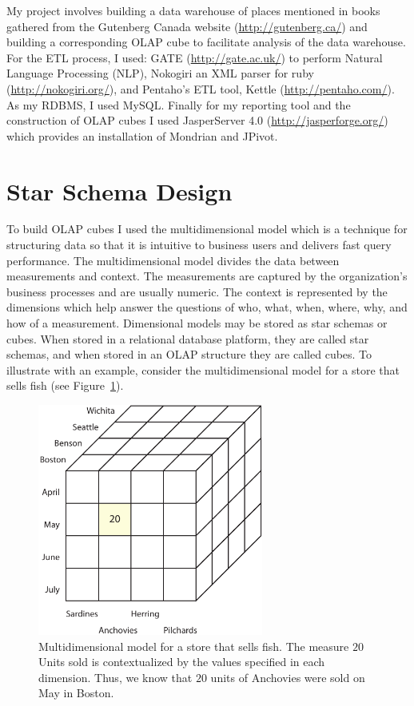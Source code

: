 My project involves building a data warehouse of places mentioned in books gathered from the Gutenberg Canada website (\url{http://gutenberg.ca/}) and building
a corresponding OLAP cube to facilitate analysis of the data warehouse. For the ETL process, I used: GATE (\url{http://gate.ac.uk/}) to perform Natural
Language Processing (NLP), Nokogiri an XML parser for ruby (\url{http://nokogiri.org/}), and Pentaho’s ETL tool, Kettle (\url{http://pentaho.com/}). As my
RDBMS, I used MySQL. Finally for my reporting tool and the construction of OLAP cubes I used JasperServer 4.0 (\url{http://jasperforge.org/}) which provides an
installation of Mondrian and JPivot.


\section{Star Schema Design} %
\label{sec:star_schema}

To build OLAP cubes I used the multidimensional model which is a technique for structuring data so that it is intuitive to business users and delivers fast
query performance. The multidimensional model divides the data between measurements and context. The measurements are captured by the organization's business
processes and are usually numeric. The context is represented by the dimensions which help answer the questions of who, what, when, where, why, and how of a
measurement. Dimensional models may be stored as star schemas or cubes. When stored in a relational database platform, they are called star schemas, and when
stored in an OLAP structure they are called cubes. To illustrate with an example, consider the multidimensional model for a store that sells fish (see
Figure~\ref{fig:figures_FishMDModel}).

\begin{figure}[htbp]
    \centering
        \includegraphics[height=3in]{figures/FishMDModel.pdf}
    \caption{Multidimensional model for a store that sells fish. The measure $20$ Units sold is contextualized by the values specified in each dimension. Thus, we know that $20$ units of Anchovies were sold on May in Boston.}
    \label{fig:figures_FishMDModel}
\end{figure}

